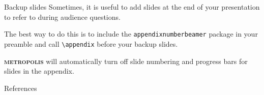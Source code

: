 \documentclass[10pt]{beamer}
\newcommand{\themename}{\textbf{\textsc{metropolis}}\xspace}
\begin{document}
\appendix

\begin{frame}[fragile]{Backup slides}
  Sometimes, it is useful to add slides at the end of your presentation to
  refer to during audience questions.

  The best way to do this is to include the \verb|appendixnumberbeamer|
  package in your preamble and call \verb|\appendix| before your backup slides.

  \themename will automatically turn off slide numbering and progress bars for
  slides in the appendix.
\end{frame}

\begin{frame}[allowframebreaks]{References}

  
  

\end{frame}
\end{document}
